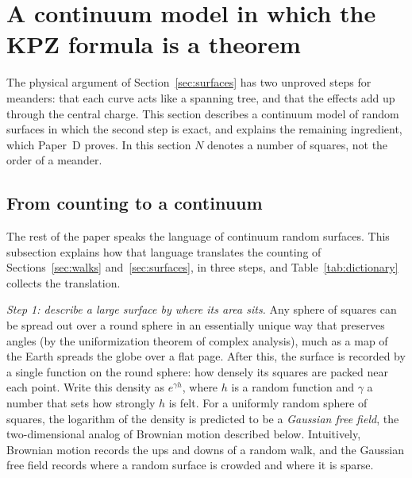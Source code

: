 \section{A continuum model in which the KPZ formula is a theorem}\label{sec:continuum}

The physical argument of Section~\ref{sec:surfaces} has two unproved steps for meanders: that
each curve acts like a spanning tree, and that the effects add up through the central charge.
This section describes a continuum model of random surfaces in which the second step is exact,
and explains the remaining ingredient, which Paper~D proves. In this section $N$ denotes a number
of squares, not the order of a meander.

\subsection{From counting to a continuum}\label{sec:dictionary}

The rest of the paper speaks the language of continuum random surfaces. This subsection explains
how that language translates the counting of Sections~\ref{sec:walks} and~\ref{sec:surfaces},
in three steps, and Table~\ref{tab:dictionary} collects the translation.

\emph{Step 1: describe a large surface by where its area sits.} Any sphere of squares can be
spread out over a round sphere in an essentially unique way that preserves angles (by the
uniformization theorem of complex analysis), much as a map of the Earth spreads the globe over a
flat page. After this, the surface is recorded by a single function on the round sphere: how
densely its squares are packed near each point. Write this density as $e^{\gamma h}$, where $h$
is a random function and $\gamma$ a number that sets how strongly $h$ is felt. For a uniformly
random sphere of squares, the logarithm of the density is predicted to be a \emph{Gaussian free
field}, the two-dimensional analog of Brownian motion described below. Intuitively, Brownian
motion records the ups and downs of a random walk, and the Gaussian free field records where a
random surface is crowded and where it is sparse.

